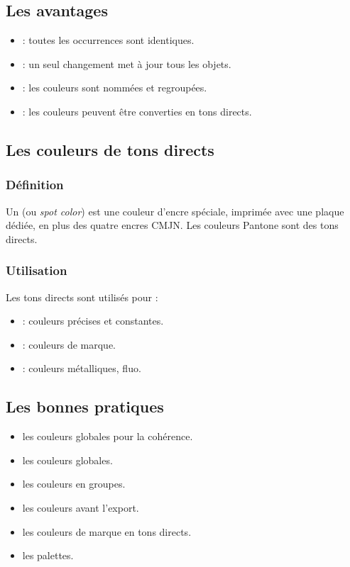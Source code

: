 \subsection{Les avantages}

\begin{itemize}
    \item {} : toutes les occurrences sont identiques.
    \item {} : un seul changement met à jour tous les objets.
    \item {} : les couleurs sont nommées et regroupées.
    \item {} : les couleurs peuvent être converties en tons directs.
\end{itemize}

\subsection{Les couleurs de tons directs}

\subsubsection{Définition}

Un  (ou \emph{spot color}) est une couleur d'encre spéciale, imprimée avec une plaque dédiée, en plus des quatre encres CMJN. Les couleurs Pantone sont des tons directs.

\subsubsection{Utilisation}

Les tons directs sont utilisés pour :

\begin{itemize}
    \item {} : couleurs précises et constantes.
    \item {} : couleurs de marque.
    \item {} : couleurs métalliques, fluo.
\end{itemize}

\subsection{Les bonnes pratiques}

\begin{itemize}
    \item {} les couleurs globales pour la cohérence.
    \item {} les couleurs globales.
    \item {} les couleurs en groupes.
    \item {} les couleurs avant l'export.
    \item {} les couleurs de marque en tons directs.
    \item {} les palettes.
\end{itemize}

